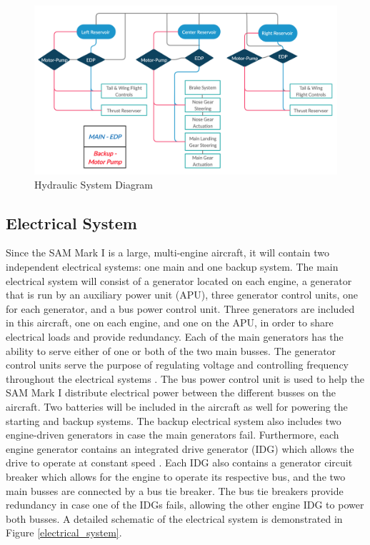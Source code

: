 \begin{figure}[H]
    \centering
    \includegraphics[width=.85\linewidth]{Photos/systems/Hydrualics.png}
    \caption{Hydraulic System Diagram}
    \label{hydrualics}
\end{figure}

\subsection{Electrical System}
Since the SAM Mark I is a large, multi-engine aircraft, it will contain two independent electrical systems: one main and one backup system. The main electrical system will consist of a generator located on each engine, a generator that is run by an auxiliary power unit (APU), three generator control units, one for each generator, and a bus power control unit. Three generators are included in this aircraft, one on each engine, and one on the APU, in order to share electrical loads and provide redundancy. Each of the main generators has the ability to serve either of one or both of the two main busses. The generator control units serve the purpose of regulating voltage and controlling frequency throughout the electrical systems \cite{electrical_system}. The bus power control unit is used to help the SAM Mark I distribute electrical power between the different busses on the aircraft. Two batteries will be included in the aircraft as well for powering the starting and backup systems. The backup electrical system also includes two engine-driven generators in case the main generators fail. Furthermore, each engine generator contains an integrated drive generator (IDG) which allows the drive to operate at constant speed \cite{electrical_system}. Each IDG also contains a generator circuit breaker which allows for the engine to operate its respective bus, and the two main busses are connected by a bus tie breaker. The bus tie breakers provide redundancy in case one of the IDGs fails, allowing the other engine IDG to power both busses. A detailed schematic of the electrical system is demonstrated in Figure \ref{electrical_system}. 

